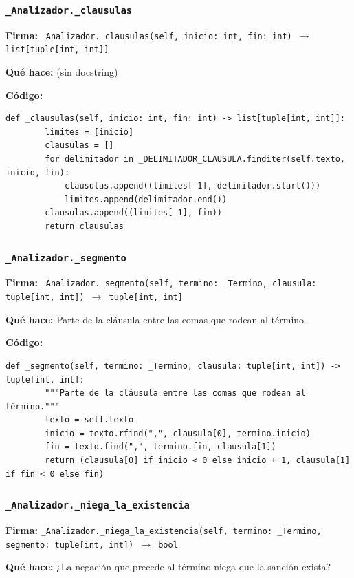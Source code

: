 \documentclass[11pt,a4paper]{article}
\begin{document}
\subsubsection*{\texttt{\_Analizador.\_clausulas}}
\textbf{Firma:} \texttt{\_Analizador.\_clausulas(self, inicio: int, fin: int) $\rightarrow$ list[tuple[int, int]]}

\textbf{Qué hace:} (sin docstring)

\textbf{Código:}
\begin{lstlisting}
def _clausulas(self, inicio: int, fin: int) -> list[tuple[int, int]]:
        limites = [inicio]
        clausulas = []
        for delimitador in _DELIMITADOR_CLAUSULA.finditer(self.texto, inicio, fin):
            clausulas.append((limites[-1], delimitador.start()))
            limites.append(delimitador.end())
        clausulas.append((limites[-1], fin))
        return clausulas
\end{lstlisting}

\subsubsection*{\texttt{\_Analizador.\_segmento}}
\textbf{Firma:} \texttt{\_Analizador.\_segmento(self, termino: \_Termino, clausula: tuple[int, int]) $\rightarrow$ tuple[int, int]}

\textbf{Qué hace:} Parte de la cláusula entre las comas que rodean al término.

\textbf{Código:}
\begin{lstlisting}
def _segmento(self, termino: _Termino, clausula: tuple[int, int]) -> tuple[int, int]:
        """Parte de la cláusula entre las comas que rodean al término."""
        texto = self.texto
        inicio = texto.rfind(",", clausula[0], termino.inicio)
        fin = texto.find(",", termino.fin, clausula[1])
        return (clausula[0] if inicio < 0 else inicio + 1, clausula[1] if fin < 0 else fin)
\end{lstlisting}

\subsubsection*{\texttt{\_Analizador.\_niega\_la\_existencia}}
\textbf{Firma:} \texttt{\_Analizador.\_niega\_la\_existencia(self, termino: \_Termino, segmento: tuple[int, int]) $\rightarrow$ bool}

\textbf{Qué hace:} ¿La negación que precede al término niega que la sanción exista?
\end{document}
